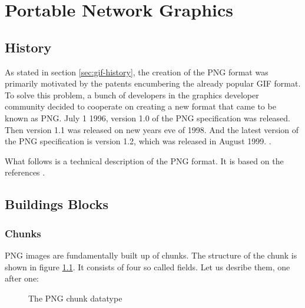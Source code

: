 \begin{comment}
  
\end{comment}


\chapter{Portable Network Graphics}
\label{cha:png}

\newcommand{\chnk}[1]{``#1''}

\newcommand{\IDAT}{\chnk{IDAT}\xspace}

\section{History}

As stated in section \ref{sec:gif-history}, the creation of the PNG
format was primarily motivated by the patents encumbering the already
popular GIF format. To solve this problem, a bunch of developers in
the graphics developer community decided to cooperate on creating a
new format that came to be known as PNG. July 1 1996, version 1.0 of
the PNG specification was released. Then version 1.1 was released on
new years eve of 1998. And the latest version of the PNG specification
is version 1.2, which was released in August 1999.
\cite{roelofs09:_histor_portab_networ_graph_png_format,roelofs99:_png,roelofs:_portab_networ_graph_main}.

What follows is a technical description of the PNG format. It is based
on the references
\cite{boutel:_png_portab_networ_graph_specif_version12,roelofs99:_png,boutel:_png_portab_networ_graph_specif_version11}.

\section{Buildings Blocks}

\subsection{Chunks}

PNG images are fundamentally built up of chunks. The structure of the
chunk is shown in figure \ref{fig:png-chunk}. It consists of four so
called fields. Let us desribe them, one after one:

\begin{figure}
  \centering
  \caption{The PNG chunk datatype}
  \label{fig:png-chunk}
\end{figure}

